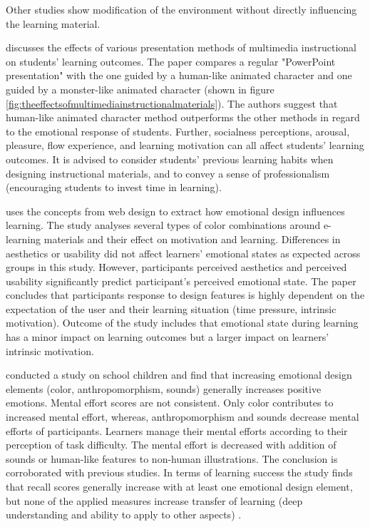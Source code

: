 

		
		Other studies show modification of the environment without directly influencing the learning material.
		
		\cite{Lee2014} discusses the effects of various presentation methods of multimedia instructional on students’ learning outcomes. The paper compares a regular "PowerPoint presentation" with the one guided by a human-like animated character and one guided by a monster-like animated character (shown in figure \ref{fig:theeffectsofmultimediainstructionalmaterials}). The authors suggest that human-like animated character method outperforms the other methods in regard to the emotional response of students. Further, socialness perceptions, arousal, pleasure, flow experience, and learning motivation can all affect students’ learning outcomes. It is advised to consider students’ previous learning habits when designing instructional materials, and to convey a sense of professionalism (encouraging students to invest time in learning).
	
		\cite{Heidig2015} uses the concepts from web design to extract how emotional design influences learning. The study analyses several types of color combinations around e-learning materials and their effect on motivation and learning. Differences in aesthetics or usability did not affect learners’ emotional states as expected across groups in this study. However, participants perceived aesthetics and perceived usability significantly predict participant's perceived emotional state. The paper concludes that participants response to design features is highly dependent on the expectation of the user and their learning situation (time pressure, intrinsic motivation). Outcome of the study includes that emotional state during learning has a minor impact on learning outcomes but a larger impact on learners’ intrinsic motivation.
		
		\cite{Uzun2018} conducted a study on school children and find that increasing emotional design elements (color, anthropomorphism, sounds) generally increases positive emotions. Mental effort scores are not consistent. Only color contributes to increased mental effort, whereas, anthropomorphism and sounds decrease mental efforts of participants. Learners manage their mental efforts according to their perception of task difficulty. The mental effort is decreased with addition of sounds or human-like features to non-human illustrations. The conclusion is corroborated with previous studies. In terms of learning success the study finds that recall scores generally increase with at least one emotional design element, but none of the applied measures increase transfer of learning (deep understanding and ability to apply to other aspects) \cite{Uzun2018}.
		
